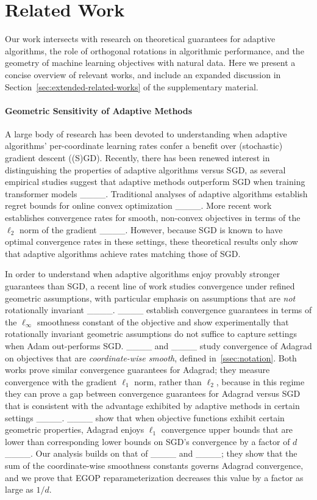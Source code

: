 \section{Related Work}
\label{ssec:related-work}

Our work intersects with research on theoretical guarantees for adaptive algorithms, the role of orthogonal rotations in algorithmic performance, and the geometry of machine learning objectives with natural data. Here we present a concise overview of relevant works, and include an expanded discussion in Section~\ref{sec:extended-related-works} of the supplementary material. 

\paragraph{Geometric Sensitivity of Adaptive Methods} A large body of research has been devoted to understanding when adaptive algorithms' per-coordinate learning rates confer a benefit over (stochastic) gradient descent ((S)GD). Recently, there has been renewed interest in distinguishing the properties of adaptive algorithms versus SGD, as several empirical studies suggest that adaptive methods outperform SGD when training transformer models ____. Traditional analyses of adaptive algorithms establish regret bounds for online convex optimization ____. More recent work establishes convergence rates for smooth, non-convex objectives in terms of the $\ell_2$ norm of the gradient ____. However, because SGD is known to have optimal convergence rates in these settings, these theoretical results only show that adaptive algorithms achieve rates matching those of SGD.

In order to understand when adaptive algorithms enjoy provably stronger guarantees than SGD, a recent line of work studies convergence under refined geometric assumptions, with particular emphasis on assumptions that are \textit{not} rotationally invariant ____. ____ establish convergence guarantees in terms of the $\ell_{\infty}$ smoothness constant of the objective and show experimentally that rotationally invariant geometric assumptions do not suffice to capture settings when Adam out-performs SGD. ____ and ____ study convergence of Adagrad on objectives that are \textit{coordinate-wise smooth}, defined in~\cref{ssec:notation}. Both works prove similar convergence guarantees for Adagrad; they measure convergence with the gradient $\ell_1$ norm, rather than $\ell_2$, because in this regime they can prove a gap between convergence guarantees for Adagrad versus SGD that is consistent with the advantage exhibited by adaptive methods in certain settings ____.
____ show that when objective functions exhibit certain geometric properties, Adagrad enjoys $\ell_1$ convergence upper bounds that are lower than corresponding lower bounds on SGD's convergence by a factor of $d$ ____. Our analysis builds on that of ____ and ____; they show that the sum of the coordinate-wise smoothness constants governs Adagrad convergence, and we prove that EGOP reparameterization decreases this value by a factor as large as $1/d$.

